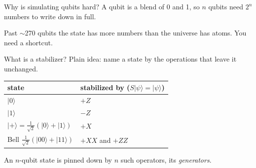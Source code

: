 \documentclass[aspectratio=169]{beamer}
\begin{document}
\begin{frame}{Why is simulating qubits hard?}
  A qubit is a blend of 0 and 1, so $n$ qubits need $2^n$ numbers to write down in full.
  \vfill
  \begin{center}
  \end{center}
  \vfill
  \begin{center}\small Past $\sim$270 qubits the state has more numbers than the universe has atoms. You need a shortcut.\end{center}
\end{frame}

\begin{frame}{What is a stabilizer?}
  \alert{Plain idea:} name a state by the operations that leave it unchanged.
  \vfill
  \begin{center}\large
  \begin{tabular}{ll}
    \toprule
    state & stabilized by ($S|\psi\rangle=|\psi\rangle$) \\
    \midrule
    $|0\rangle$ & $+Z$ \\
    $|1\rangle$ & $-Z$ \\
    $|{+}\rangle=\tfrac{1}{\sqrt2}(|0\rangle+|1\rangle)$ & $+X$ \\
    Bell $\tfrac{1}{\sqrt2}(|00\rangle+|11\rangle)$ & $+XX$ and $+ZZ$ \\
    \bottomrule
  \end{tabular}
  \end{center}
  \vfill
  \begin{center}\small An $n$-qubit state is pinned down by $n$ such operators, its \emph{generators}.\end{center}
\end{frame}
\end{document}
